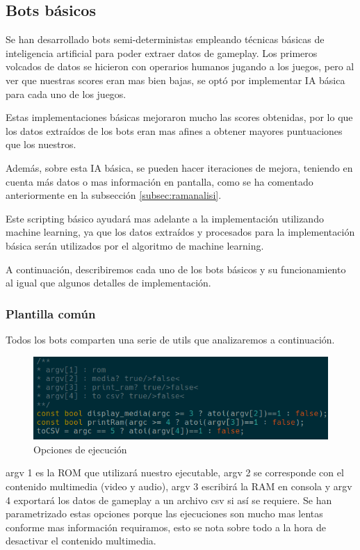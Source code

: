 \newpage
\subsection{Bots básicos}
\label{subsec:botsbasicos}
Se han desarrollado bots semi-deterministas empleando técnicas básicas de inteligencia artificial para poder extraer datos de gameplay. Los primeros volcados de datos se hicieron con operarios humanos jugando a los juegos, pero al ver que nuestras scores eran mas bien bajas, se optó por implementar IA básica para cada uno de los juegos. 

Estas implementaciones básicas mejoraron mucho las scores obtenidas, por lo que los datos extraídos de los bots eran mas afines a obtener mayores puntuaciones que los nuestros.

Además, sobre esta IA básica, se pueden hacer iteraciones de mejora, teniendo en cuenta más datos o mas información en pantalla, como se ha comentado anteriormente en la subsección \ref{subsec:ramanalisi}.

Este scripting básico ayudará mas adelante a la implementación utilizando machine learning, ya que los datos extraídos y procesados para la implementación básica serán utilizados por el algoritmo de machine learning.

A continuación, describiremos cada uno de los bots básicos y su funcionamiento al igual que algunos detalles de implementación.

\subsubsection{Plantilla común}
\label{subsec:botsbasicos:plantcomun}
Todos los bots comparten una serie de utils que analizaremos a continuación.

\begin{figure}[h]
	\centering
	\includegraphics[width=1\textwidth]{Figures/ALEMediaSettings}
	\caption{Opciones de ejecución}
	\label{fig:ALEMediaSettings}
\end{figure}

argv 1 es la ROM que utilizará nuestro ejecutable, argv 2 se corresponde con el contenido multimedia (video y audio), argv 3 escribirá la RAM en consola y argv 4 exportará los datos de gameplay a un archivo \ac{csv} si así se requiere. Se han parametrizado estas opciones porque las ejecuciones son mucho mas lentas conforme mas información requiramos, esto se nota sobre todo a la hora de desactivar el contenido multimedia.

